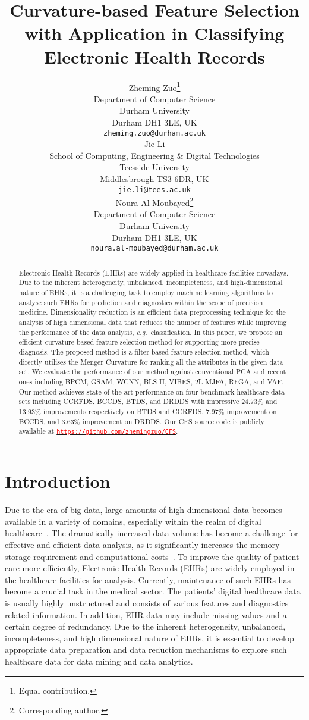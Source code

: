 \documentclass{article}
\title{Curvature-based Feature Selection with Application in Classifying Electronic Health Records}
\author{
 Zheming Zuo\thanks{Equal contribution.} \\
  Department of Computer Science\\
  Durham University\\
  Durham DH1 3LE, UK\\
  \texttt{zheming.zuo@durham.ac.uk} \\
\And
 Jie Li \\
  School of Computing, Engineering \& Digital Technologies\\
  Teesside University\\
  Middlesbrough TS3 6DR, UK\\
  \texttt{jie.li@tees.ac.uk} \\
  \And
 Noura Al Moubayed\thanks{Corresponding author.} \\
  Department of Computer Science\\
  Durham University\\
  Durham DH1 3LE, UK\\
  \texttt{noura.al-moubayed@durham.ac.uk} \\
}
\newcommand{\zzeg}{\emph{e.g.}~}
\newcommand*{\1}{\textcolor{red}}
\begin{document}
\maketitle
\begin{abstract}
Electronic Health Records (EHRs) are widely applied in healthcare facilities nowadays. Due to the inherent heterogeneity, unbalanced, incompleteness, and high-dimensional nature of EHRs, it is a challenging task to employ machine learning algorithms to analyse such EHRs for prediction and diagnostics within the scope of precision medicine. Dimensionality reduction is an efficient data preprocessing technique for the analysis of high dimensional data that reduces the number of features while improving the performance of the data analysis, \zzeg classification. In this paper, we propose an efficient curvature-based feature selection method for supporting more precise diagnosis. The proposed method is a filter-based feature selection method, which directly utilises the Menger Curvature for ranking all the attributes in the given data set. We evaluate the performance of our method against conventional PCA and recent ones including BPCM, GSAM, WCNN, BLS II, VIBES, 2L-MJFA, RFGA, and VAF. Our method achieves state-of-the-art performance on four benchmark healthcare data sets including CCRFDS, BCCDS, BTDS, and DRDDS with impressive 24.73\% and 13.93\% improvements respectively on BTDS and CCRFDS, 7.97\% improvement on BCCDS, and 3.63\% improvement on DRDDS. Our CFS source code is publicly available at \href{https://github.com/zhemingzuo/CFS}{\texttt{\1{https://github.com/zhemingzuo/CFS}}}. 
\end{abstract}




\section{Introduction}
Due to the era of big data, large amounts of high-dimensional data becomes available in a variety of domains, especially within the realm of digital healthcare~\cite{8370732}. The dramatically increased data volume has become a challenge for effective and efficient data analysis, as it significantly increases the memory storage requirement and computational costs~\cite{li2017feature}. To improve the quality of patient care more efficiently, Electronic Health Records (EHRs) are widely employed in the healthcare facilities for analysis. Currently, maintenance of such EHRs has become a crucial task in the medical sector. The patients' digital healthcare data is usually highly unstructured and consists of various features and diagnostics related information. In addition, EHR data may include missing values and a certain degree of redundancy. Due to the inherent heterogeneity, unbalanced, incompleteness, and high dimensional nature of EHRs, it is essential to develop appropriate data preparation and data reduction mechanisms to explore such healthcare data for data mining and data analytics. 
\end{document}
